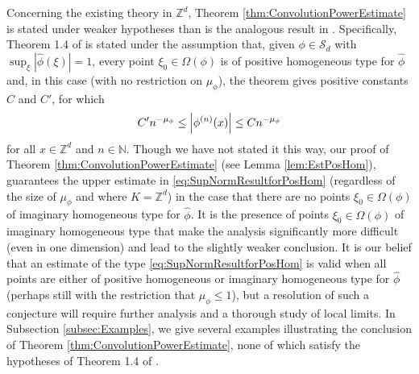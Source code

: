 \documentclass[11pt]{article}
\theoremstyle{remark}
\begin{document}
\noindent Concerning the existing theory in $\mathbb{Z}^d$, Theorem \ref{thm:ConvolutionPowerEstimate} is stated under weaker hypotheses than is the analogous result in \cite{randles_convolution_2017}. Specifically, Theorem 1.4 of \cite{randles_convolution_2017} is stated under the assumption that, given $\phi\in\mathcal{S}_d$ with $\sup_{\xi}|\widehat{\phi}(\xi)|=1$, every point $\xi_0\in\Omega(\phi)$ is of positive homogeneous type for $\widehat{\phi}$ and, in this case (with no restriction on $\mu_\phi$), the theorem gives positive constants $C$ and $C'$, for which
\begin{equation}\label{eq:SupNormResultforPosHom}
    C'n^{-\mu_\phi}\leq \abs{\phi^{(n)}(x)}\leq C n^{-\mu_\phi}
\end{equation}
for all $x\in\mathbb{Z}^d$ and $n\in\mathbb{N}$. Though we have not stated it this way, our proof of Theorem \ref{thm:ConvolutionPowerEstimate} (see Lemma \ref{lem:EstPosHom}), guarantees the upper estimate in \eqref{eq:SupNormResultforPosHom} (regardless of the size of $\mu_\phi$ and where $K=\mathbb{Z}^d$) in the case that there are no points $\xi_0\in\Omega(\phi)$ of imaginary homogeneous type for $\widehat{\phi}$. It is the presence of points $\xi_0\in\Omega(\phi)$ of imaginary homogeneous type that make the analysis significantly more difficult (even in one dimension) and lead to the slightly weaker conclusion. It is our belief that an estimate of the type \eqref{eq:SupNormResultforPosHom} is valid when all points are either of positive homogeneous or imaginary homogeneous type for $\widehat\phi$ (perhaps still with the restriction that $\mu_\phi\leq 1$), but a resolution of such a conjecture will require further analysis and a thorough study of local limits. In Subsection \ref{subsec:Examples}, we give several examples illustrating the conclusion of Theorem \ref{thm:ConvolutionPowerEstimate}, none of which satisfy the hypotheses of Theorem 1.4 of \cite{randles_convolution_2017}.\\
\end{document}
